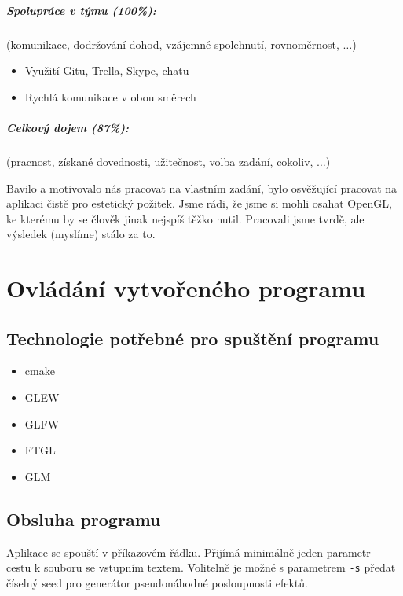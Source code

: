 \documentclass[12pt,a4paper,titlepage,final]{report}
\begin{document}
\paragraph{Spolupráce v týmu (100\%):} (komunikace, dodržování dohod, vzájemné
spolehnutí, rovnoměrnost, $\ldots$)

  \begin{itemize}
  \item Využití Gitu, Trella, Skype, chatu
  \item Rychlá komunikace v obou směrech
  \end{itemize}

\paragraph{Celkový dojem (87\%):} (pracnost, získané dovednosti, užitečnost,
volba zadání, cokoliv, $\ldots$)

Bavilo a motivovalo nás pracovat na vlastním zadání, bylo osvěžující pracovat na aplikaci čistě pro estetický požitek.
Jsme rádi, že jsme si mohli osahat OpenGL, ke kterému by se člověk jinak nejspíš těžko nutil. Pracovali jsme tvrdě, ale výsledek (myslíme) stálo za to.

\chapter{Ovládání vytvořeného programu}

\section{Technologie potřebné pro spuštění programu}

\begin{itemize}
    \item cmake
	\item GLEW
    \item GLFW
    \item FTGL
    \item GLM
\end{itemize}

\section{Obsluha programu}

Aplikace se spouští v příkazovém řádku. Přijímá minimálně jeden parametr - cestu k souboru se vstupním textem. Volitelně je možné s parametrem \texttt{-s} předat číselný seed pro generátor pseudonáhodné posloupnosti efektů.
\end{document}
